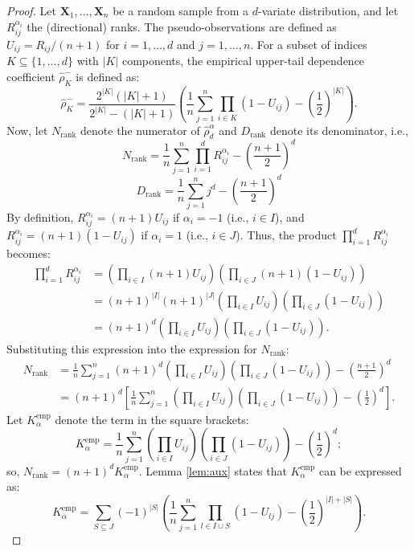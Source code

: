 \documentclass[10pt,a4paper]{amsart}
\begin{document}
\begin{proof}Let $\mathbf{X}_1, \ldots, \mathbf{X}_n$ be a random sample from a $d$-variate distribution, and let $R_{ij}^{\alpha_i}$ the (directional) ranks. The pseudo-observations are defined as $U_{ij} = R_{ij}/(n+1)$ for $i=1,\ldots,d$ and $j=1,\ldots,n$. For a subset of indices $K \subseteq \{1,\ldots,d\}$ with $|K|$ components, the empirical upper-tail dependence coefficient $\widehat{\rho}_K^-$ is defined as:
$$\widehat{\rho}_K^- = \frac{2^{|K|}(|K|+1)}{2^{|K|}-(|K|+1)} \left( \frac{1}{n} \sum_{j=1}^n \prod_{i \in K} (1 - U_{ij}) - \left(\frac{1}{2}\right)^{|K|} \right).$$
Now, let $N_{\text{rank}}$ denote the numerator of $\widehat{\rho}_d^{\alpha}$ and $D_{\text{rank}}$ denote its denominator, i.e.,
$$N_{\text{rank}} = \frac{1}{n}\sum_{j=1}^n\prod_{i=1}^dR_{ij}^{\alpha_i}-\left(\frac{n+1}{2}\right)^d$$
$$D_{\text{rank}} = \frac{1}{n}\sum_{j=1}^nj^d-\left(\frac{n+1}{2}\right)^d$$
By definition, $R_{ij}^{\alpha_i} = (n+1)U_{ij}$ if $\alpha_i = -1$ (i.e., $i \in I$), and $R_{ij}^{\alpha_i} = (n+1)(1-U_{ij})$ if $\alpha_i = 1$ (i.e., $i \in J$). Thus, the product $\prod_{i=1}^d R_{ij}^{\alpha_i}$ becomes:
\begin{align*} \prod_{i=1}^d R_{ij}^{\alpha_i} &= \left(\prod_{i \in I} (n+1)U_{ij}\right) \left(\prod_{i \in J} (n+1)(1-U_{ij})\right) \\ &= (n+1)^{|I|} (n+1)^{|J|} \left(\prod_{i \in I} U_{ij}\right) \left(\prod_{i \in J} (1-U_{ij})\right) \\ &= (n+1)^d \left(\prod_{i \in I} U_{ij}\right) \left(\prod_{i \in J} (1-U_{ij})\right).
\end{align*}
Substituting this expression into the expression for $N_{\text{rank}}$:
\begin{align*} N_{\text{rank}} &= \frac{1}{n}\sum_{j=1}^n (n+1)^d \left(\prod_{i \in I} U_{ij}\right) \left(\prod_{i \in J} (1-U_{ij})\right) - \left(\frac{n+1}{2}\right)^d \\ &= (n+1)^d \left[ \frac{1}{n}\sum_{j=1}^n \left(\prod_{i \in I} U_{ij}\right) \left(\prod_{i \in J} (1-U_{ij})\right) - \left(\frac{1}{2}\right)^d \right]. \end{align*}
Let $K_{\alpha}^{\text{emp}}$ denote the term in the square brackets:
$$K_{\alpha}^{\text{emp}} = \frac{1}{n}\sum_{j=1}^n \left(\prod_{i \in I} U_{ij}\right) \left(\prod_{i \in J} (1-U_{ij})\right) - \left(\frac{1}{2}\right)^d;$$
so, $N_{\text{rank}} = (n+1)^d K_{\alpha}^{\text{emp}}$. Lemma \ref{lem:aux} states that $K_{\alpha}^{\text{emp}}$ can be expressed as:
$$K_{\alpha}^{\text{emp}} = \sum_{S \subseteq J} (-1)^{|S|} \left( \frac{1}{n} \sum_{j=1}^n \prod_{l \in I \cup S} (1 - U_{lj}) - \left(\frac{1}{2}\right)^{|I|+|S|} \right).$$

\end{proof}
\end{document}
